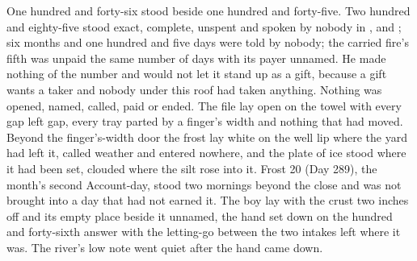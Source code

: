 One hundred and forty-six stood beside one hundred and forty-five. Two hundred and eighty-five stood exact, complete, unspent and spoken by nobody in ,  and ; six months and one hundred and five days were told by nobody; the carried fire's fifth was unpaid the same number of days with its payer unnamed. He made nothing of the number and would not let it stand up as a gift, because a gift wants a taker and nobody under this roof had taken anything. Nothing was opened, named, called, paid or ended. The file lay open on the towel with every gap left gap, every tray parted by a finger's width and nothing that had moved. Beyond the finger's-width door the frost lay white on the well lip where the yard had left it, called weather and entered nowhere, and the plate of ice stood where it had been set, clouded where the silt rose into it. Frost 20 (Day 289), the month's second Account-day, stood two mornings beyond the close and was not brought into a day that had not earned it. The boy lay with the crust two inches off and its empty place beside it unnamed, the hand set down on the hundred and forty-sixth answer with the letting-go between the two intakes left where it was. The river's low note went quiet after the hand came down.
